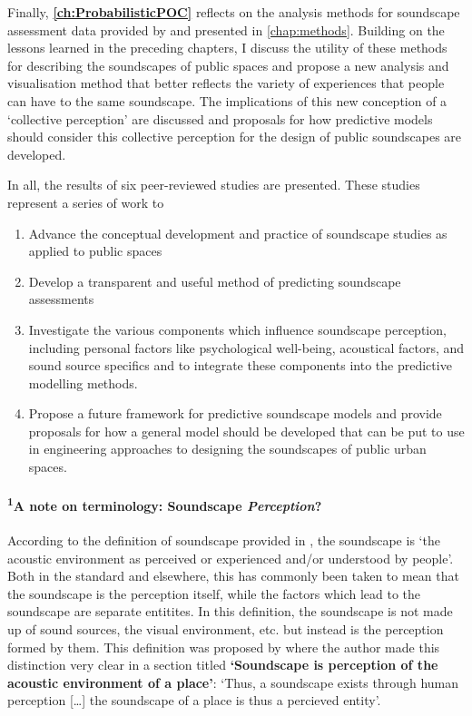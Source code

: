 Finally, \textbf{\cref{ch:ProbabilisticPOC}} reflects on the analysis methods for soundscape assessment data provided by \citet{ISO12913Part2} and presented in \cref{chap:methods}. Building on the lessons learned in the preceding chapters, I discuss the utility of these methods for describing the soundscapes of public spaces and propose a new analysis and visualisation method that better reflects the variety of experiences that people can have to the same soundscape. The implications of this new conception of a `collective perception' are discussed and proposals for how predictive models should consider this collective perception for the design of public soundscapes are developed.

In all, the results of six peer-reviewed studies are presented. These studies represent a series of work to

\begin{enumerate}
  \item Advance the conceptual development and practice of soundscape studies as applied to public spaces
  \item Develop a transparent and useful method of predicting soundscape assessments
  \item Investigate the various components which influence soundscape perception, including personal factors like psychological well-being, acoustical factors, and sound source specifics and to integrate these components into the predictive modelling methods.
  \item Propose a future framework for predictive soundscape models and provide proposals for how a general model should be developed that can be put to use in engineering approaches to designing the soundscapes of public urban spaces. 
\end{enumerate}

\newpage


\paragraph*{\textsuperscript{1}A note on terminology: Soundscape \emph{Perception}?}

According to the definition of soundscape provided in \citet{ISO12913Part1}, the soundscape is `the acoustic environment as perceived or experienced and/or understood by people'. Both in the standard and elsewhere, this has commonly been taken to mean that the soundscape is the perception itself, while the factors which lead to the soundscape are separate entitites. In this definition, the soundscape is not made up of sound sources, the visual environment, etc. but instead is the perception formed by them. This definition was proposed by \citet{Brown2012review} where the author made this distinction very clear in a section titled \textbf{`Soundscape is perception of the acoustic environment of a place'}: `Thus, a soundscape exists through human perception [\ldots] the soundscape of a place is thus a percieved entity'.

